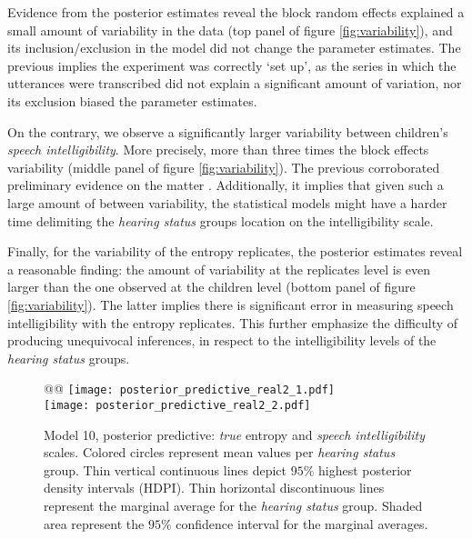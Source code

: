 Evidence from the posterior estimates reveal the block random effects explained a small amount of variability in the data (top panel of figure \ref{fig:variability}), and its inclusion/exclusion in the model did not change the parameter estimates. The previous implies the experiment was correctly `set up', as the series in which the utterances were transcribed did not explain a significant amount of variation, nor its exclusion biased the parameter estimates.

On the contrary, we observe a significantly larger variability between children's \textit{speech intelligibility}. More precisely, more than three times the block effects variability (middle panel of figure \ref{fig:variability}). The previous corroborated preliminary evidence on the matter \cite{Young_et_al_2002, Peng_et_al_2004, Montag_et_al_2014, Castellanos_et_al_2014, Yanbay_et_al_2014, Nittrouer_et_al_2014, Freeman_et_al_2017, Boonen_et_al_2021}. Additionally, it implies that given such a large amount of between variability, the statistical models might have a harder time delimiting the \textit{hearing status} groups location on the intelligibility scale.

Finally, for the variability of the entropy replicates, the posterior estimates reveal a reasonable finding: the amount of variability at the replicates level is even larger than the one observed at the children level (bottom panel of figure \ref{fig:variability}). The latter implies there is significant error in measuring speech intelligibility with the entropy replicates. This further emphasize the difficulty of producing unequivocal  inferences, in respect to the intelligibility levels of the \textit{hearing status} groups.
%
%
\begin{figure}[!h]
	\centering
	\begin{tabular}{@{}@{}}
	\texttt{[image: posterior\_predictive\_real2\_1.pdf]} \\
	\texttt{[image: posterior\_predictive\_real2\_2.pdf]}
	\end{tabular}
	\caption[Model 10, posterior predictive: \textit{true} entropy and \textit{speech intelligibility} scales]{Model 10, posterior predictive: \textit{true} entropy and \textit{speech intelligibility} scales. Colored circles represent mean values per \textit{hearing status} group. Thin vertical continuous lines depict $95\%$ highest posterior density intervals (HDPI). Thin horizontal discontinuous lines represent the marginal average for the \textit{hearing status} group. Shaded area represent the $95\%$ confidence interval for the marginal averages.}
	\label{fig:predictive2}
\end{figure}
%
%
